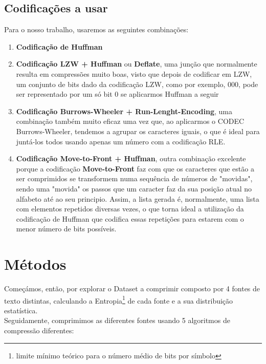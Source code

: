 \documentclass[10pt,journal,compsoc]{IEEEtran}
\begin{document}
    \subsection{Codificações a usar}
    Para o nosso trabalho, usaremos as seguintes combinações:
    \begin{enumerate}
        \item \textbf{Codificação de Huffman}
        \item \textbf{Codificação LZW + Huffman} ou \textbf{Deflate}, uma junção que normalmente resulta em compressões muito boas, visto que depois de codificar em LZW, um conjunto de bits dado da codificação LZW, como por exemplo, 000, pode ser representado por um só bit 0 se aplicarmos Huffman a seguir
        \item \textbf{Codificação Burrows-Wheeler + Run-Lenght-Encoding}, uma combinação também muito eficaz uma vez que, ao aplicarmos o CODEC Burrows-Wheeler, tendemos a agrupar os caracteres iguais, o que é ideal para juntá-los todos usando apenas um número com a codificação RLE. %
        \item \textbf{Codificação Move-to-Front + Huffman}, outra combinação excelente porque a codificação \textbf{Move-to-Front} faz com que os caracteres que estão a ser comprimidos se transformem numa sequência de números de "movidas", sendo uma "movida" os passos que um caracter faz da sua posição atual no alfabeto até ao seu principio. Assim, a lista gerada é, normalmente, uma lista com elementos repetidos diversas vezes, o que torna ideal a utilização da codificação de Huffman que codifica essas repetições para estarem com o menor número de bits possíveis.
    \end{enumerate}
    
    
    \section{Métodos}\label{sec:metodos}
    Começámos, então, por explorar o Dataset a comprimir composto por 4 fontes de texto distintas, calculando a Entropia\footnote{limite mínimo teórico para o número médio de bits por símbolo} de cada fonte e a sua distribuição estatística.\\
    Seguidamente, comprimimos as diferentes fontes usando 5 algoritmos de compressão diferentes:
    
\end{document}
